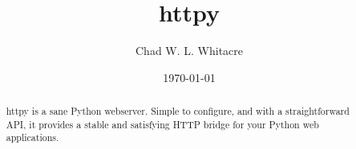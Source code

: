 \documentclass{manual}
\title{httpy}
\author{Chad W. L. Whitacre}
\date\today
\begin{document}
\maketitle

\begin{abstract}

\noindent
httpy is a sane Python webserver. Simple to configure, and with a
straightforward API, it provides a stable and satisfying HTTP bridge for your
Python web applications.

\end{abstract}










%
%
%
\renewcommand{\indexname}{Module Index}

\renewcommand{\indexname}{Index}
\end{document}
